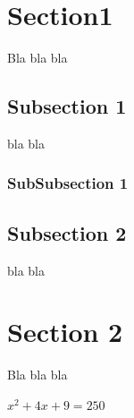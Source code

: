 \documentclass[12pt,a4paper]{report}
\begin{document}
\pagebreak

\section{Section1}
Bla bla bla
\subsection{Subsection 1}
bla bla
\subsubsection{SubSubsection 1}

\subsection{Subsection 2}
bla bla

\section{Section 2}
Bla bla bla

$ x^2 + 4x + 9 = 250 $
\end{document}
